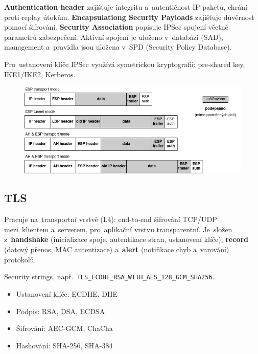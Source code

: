 \textbf{Authentication header} zajišťuje integritu a~autentičnost IP paketů, chrání proti replay útokům. \textbf{Encapsulationg Security Payloads} zajišťuje důvěrnost pomocí šifrování. \textbf{Security Association} popisuje IPSec spojení včetně parametrů zabezpečení. Aktivní spojení je uloženo v~databázi (SAD), management a~pravidla jsou uložena v~SPD (Security Policy Database).

Pro~ustanovení klíče IPSec využívá symetrickou kryptografii: pre-shared key, IKE1/IKE2, Kerberos.

\begin{figure}[ht]
\centering
\includegraphics[width=\textwidth]{images/ipsec-modes}
\end{figure}

\clearpage
\subsection{TLS}

Pracuje na~transportní vrstvě (L4): end-to-end šifrování TCP/UDP mezi~klientem a~serverem, pro~aplikační vrstvu transparentní. Je~složen z~\textbf{handshake} (inicializace spoje, autentikace stran, ustanovení klíče), \textbf{record} (datový přenos, MAC autentizace) a~\textbf{alert} (notifikace chyb a~varování) protokolů.

Security strings, např.~\texttt{TLS\_ECDHE\_RSA\_WITH\_AES\_128\_GCM\_SHA256}.

\begin{itemize}[noitemsep]
\item Ustanovení klíče: ECDHE, DHE
\item Podpis: RSA, DSA, ECDSA
\item Šifrování: AEC-GCM, ChaCha
\item Hashování: SHA-256, SHA-384
\end{itemize}

